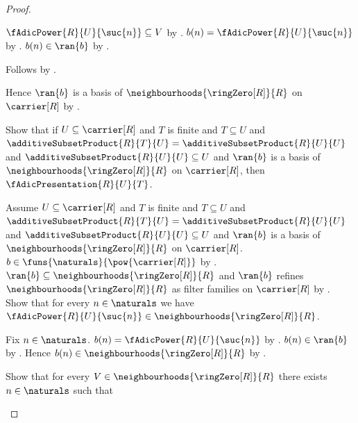 \begin{proof}
\begin{subproof}
\begin{subproof}
\begin{subproof}
                    $\fAdicPower{R}{U}{\suc{n}}\subseteq V$ by
                    .
                $b(n)=\fAdicPower{R}{U}{\suc{n}}$ by
                    .
                $b(n)\in\ran{b}$ by
                    .
            \end{subproof}
            Follows by .
        \end{subproof}
        Hence $\ran{b}$ is a basis of
            $\neighbourhoods{\ringZero[R]}{R}$ on $\carrier[R]$ by
            .
    \end{subproof}

    Show that if $U\subseteq\carrier[R]$ and $T$ is finite and
        $T\subseteq U$ and
        $\additiveSubsetProduct{R}{T}{U}
            =\additiveSubsetProduct{R}{U}{U}$ and
        $\additiveSubsetProduct{R}{U}{U}\subseteq U$ and
        $\ran{b}$ is a basis of
            $\neighbourhoods{\ringZero[R]}{R}$ on $\carrier[R]$, then
        $\fAdicPresentation{R}{U}{T}$.
    \begin{subproof}
        Assume $U\subseteq\carrier[R]$ and $T$ is finite and
            $T\subseteq U$ and
            $\additiveSubsetProduct{R}{T}{U}
                =\additiveSubsetProduct{R}{U}{U}$ and
            $\additiveSubsetProduct{R}{U}{U}\subseteq U$ and
            $\ran{b}$ is a basis of
                $\neighbourhoods{\ringZero[R]}{R}$ on $\carrier[R]$.
        $b\in\funs{\naturals}{\pow{\carrier[R]}}$ by
            .
        $\ran{b}\subseteq\neighbourhoods{\ringZero[R]}{R}$ and
            $\ran{b}$ refines $\neighbourhoods{\ringZero[R]}{R}$ as
                filter families on $\carrier[R]$ by
            .
        Show that for every $n\in\naturals$ we have
            $\fAdicPower{R}{U}{\suc{n}}
                \in\neighbourhoods{\ringZero[R]}{R}$.
        \begin{subproof}
            Fix $n\in\naturals$.
            $b(n)=\fAdicPower{R}{U}{\suc{n}}$ by
                .
            $b(n)\in\ran{b}$ by
                .
            Hence $b(n)\in\neighbourhoods{\ringZero[R]}{R}$ by
                .
        \end{subproof}
        Show that for every $V\in\neighbourhoods{\ringZero[R]}{R}$ there
            exists $n\in\naturals$ such that

\end{subproof}
\end{proof}
